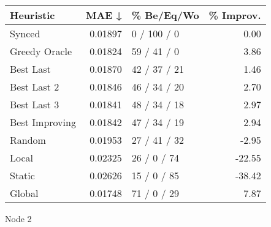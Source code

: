 \begin{tabular}{lrlr}
\toprule
\textbf{Heuristic} & \textbf{MAE ↓} & \textbf{\% Be/Eq/Wo} & \textbf{\% Improv.} \\
\midrule
            Synced &        0.01897 &          0 / 100 / 0 &                0.00 \\
     Greedy Oracle &        0.01824 &          59 / 41 / 0 &                3.86 \\
         Best Last &        0.01870 &         42 / 37 / 21 &                1.46 \\
       Best Last 2 &        0.01846 &         46 / 34 / 20 &                2.70 \\
       Best Last 3 &        0.01841 &         48 / 34 / 18 &                2.97 \\
    Best Improving &        0.01842 &         47 / 34 / 19 &                2.94 \\
            Random &        0.01953 &         27 / 41 / 32 &               -2.95 \\
             Local &        0.02325 &          26 / 0 / 74 &              -22.55 \\
            Static &        0.02626 &          15 / 0 / 85 &              -38.42 \\
            Global &        0.01748 &          71 / 0 / 29 &                7.87 \\
\bottomrule
\end{tabular}
\caption{Node 2}
\label{tab:iid_lr05_le2_bs2_2}
